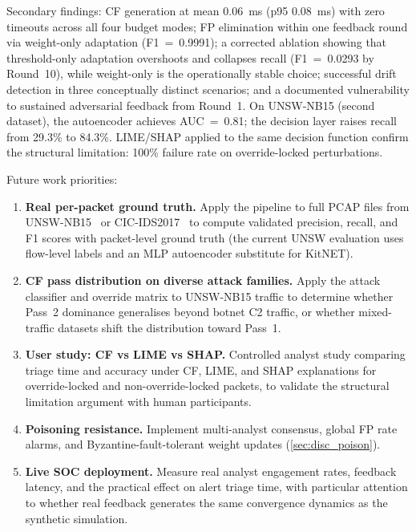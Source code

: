 \documentclass[preprint,12pt,authoryear]{elsarticle}
\begin{document}
Secondary findings: CF generation at mean \SI{0.06}{\ms} (p95 \SI{0.08}{\ms})
with zero timeouts across all four budget modes; FP elimination within one
feedback round via weight-only adaptation (F1~=~0.9991); a corrected ablation
showing that threshold-only adaptation overshoots and collapses recall
(F1~=~0.0293 by Round~10), while weight-only is the operationally stable choice;
successful drift detection in three conceptually distinct scenarios; and a
documented vulnerability to sustained adversarial feedback from Round~1.
On UNSW-NB15 (second dataset), the autoencoder achieves AUC~=~0.81; the
decision layer raises recall from 29.3\% to 84.3\%.
LIME/SHAP applied to the same decision function confirm the structural
limitation: 100\% failure rate on override-locked perturbations.

Future work priorities:
\begin{enumerate}
\item \textbf{Real per-packet ground truth.} Apply the pipeline to full PCAP
  files from UNSW-NB15~\citep{Moustafa2015} or CIC-IDS2017~\citep{Sharafaldin2018}
  to compute validated precision, recall, and F1 scores with packet-level
  ground truth (the current UNSW evaluation uses flow-level labels and an
  MLP autoencoder substitute for KitNET).
\item \textbf{CF pass distribution on diverse attack families.} Apply the attack
  classifier and override matrix to UNSW-NB15 traffic to determine whether
  Pass~2 dominance generalises beyond botnet C2 traffic, or whether mixed-traffic
  datasets shift the distribution toward Pass~1.
\item \textbf{User study: CF vs LIME vs SHAP.} Controlled analyst study comparing
  triage time and accuracy under CF, LIME, and SHAP explanations for
  override-locked and non-override-locked packets, to validate the structural
  limitation argument with human participants.
\item \textbf{Poisoning resistance.} Implement multi-analyst consensus, global FP
  rate alarms, and Byzantine-fault-tolerant weight updates
  (\cref{sec:disc_poison}).
\item \textbf{Live SOC deployment.} Measure real analyst engagement rates,
  feedback latency, and the practical effect on alert triage time, with
  particular attention to whether real feedback generates the same convergence
  dynamics as the synthetic simulation.
\end{enumerate}

\end{document}

